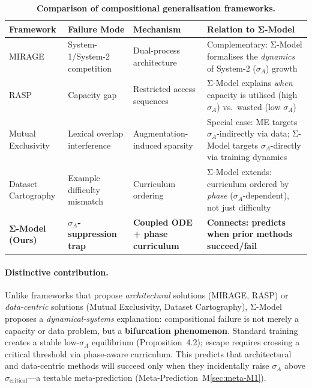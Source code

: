 \documentclass[11pt,a4paper]{article}
\begin{document}
\begin{table}[htbp]
\centering
\caption{\textbf{Comparison of compositional generalisation frameworks.}}
\label{tab:framework-comparison}
\small
\begin{tabular}{>{\raggedright\arraybackslash}p{2.0cm}>{\raggedright\arraybackslash}p{2.5cm}>{\raggedright\arraybackslash}p{2.5cm}>{\raggedright\arraybackslash}p{5.0cm}}
\toprule
\textbf{Framework} & \textbf{Failure Mode} & \textbf{Mechanism} & \textbf{Relation to Σ-Model} \\
\midrule
MIRAGE \citep{noviello2025neuroscienceinspiredualprocess}
  & System-1/System-2 competition
  & Dual-process architecture
  & Complementary: Σ-Model formalises the \emph{dynamics} of System-2 ($\sigma_A$) growth \\

RASP \citep{bruns2025exploringcompositionalgeneralizationin}
  & Capacity gap
  & Restricted access sequences
  & Σ-Model explains \emph{when} capacity is utilised (high $\sigma_A$) vs.\ wasted (low $\sigma_A$) \\

Mutual Exclusivity \citep{jiang2022mutualexclusivity}
  & Lexical overlap interference
  & Augmentation-induced sparsity
  & Special case: ME targets $\sigma_A$-indirectly via data; Σ-Model targets $\sigma_A$-directly via training dynamics \\

Dataset Cartography \citep{swayamdipta2020datasetcartography}
  & Example difficulty mismatch
  & Curriculum ordering
  & Σ-Model extends: curriculum ordered by \emph{phase} ($\sigma_A$-dependent), not just difficulty \\

\textbf{Σ-Model (Ours)}
  & \textbf{$\sigma_A$-suppression trap}
  & \textbf{Coupled ODE + phase curriculum}
  & \textbf{Connects: predicts when prior methods succeed/fail} \\
\bottomrule
\end{tabular}
\end{table}

\paragraph{Distinctive contribution.}
Unlike frameworks that propose \emph{architectural} solutions (MIRAGE,
RASP) or \emph{data-centric} solutions (Mutual Exclusivity, Dataset
Cartography), Σ-Model proposes a \emph{dynamical-systems} explanation:
compositional failure is not merely a capacity or data problem, but a
\textbf{bifurcation phenomenon}. Standard training creates a stable
low-$\sigma_A$ equilibrium (Proposition~4.2); escape requires crossing
a critical threshold via phase-aware curriculum. This predicts that
architectural and data-centric methods will succeed only when they
incidentally raise $\sigma_A$ above $\sigma_{\text{critical}}$---a
testable meta-prediction (Meta-Prediction~M\ref{sec:meta-M1}).
\end{document}
